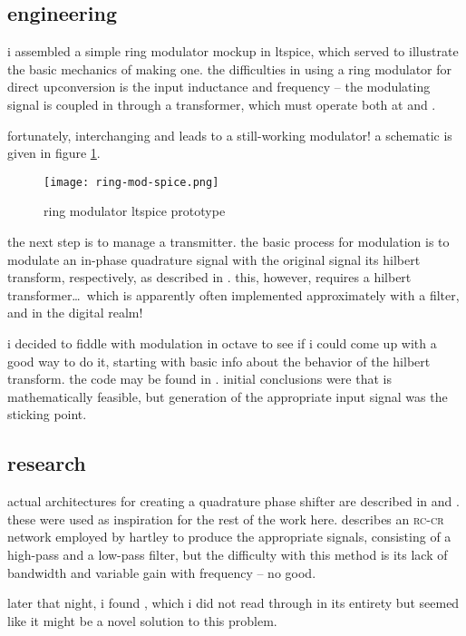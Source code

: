 \subsection*{engineering}
i assembled a simple ring modulator mockup in ltspice, which served to
illustrate the basic mechanics of making one. the difficulties in using a ring
modulator for direct upconversion is the input inductance and frequency -- the
modulating signal is coupled in through a transformer, which must operate both
at \rf and \ifreq.

fortunately, interchanging \rf and \ifreq leads to a still-working modulator! a
schematic is given in figure \ref{fig:ring-mod-spice}.

\begin{figure}[H]
	\centering
	\texttt{[image: ring-mod-spice.png]}
	\caption{ring modulator ltspice prototype}
	\label{fig:ring-mod-spice}
\end{figure}

the next step is to manage a \ssb transmitter. the basic process for \ssb
modulation is to modulate an in-phase \amp quadrature signal with the original
signal \amp its hilbert transform, respectively, as described in
\autocite{matlab-ssb}. this, however, requires a hilbert transformer\ldots\
which is apparently often implemented approximately with a filter, and in the
digital realm!

i decided to fiddle with \ssb modulation in octave to see if i could come up
with a good way to do it, starting with basic info about the behavior of the
hilbert transform. the code may be found in
. initial conclusions were that \ssb is
mathematically feasible, but generation of the appropriate input signal was the
sticking point.

\subsection*{research}

actual architectures for creating a quadrature phase shifter are described in
\autocite{wideband-shifter} and \autocite{audio-shifter}. these were used as
inspiration for the rest of the work here. \autocite{wideband-shifter}
describes an \textsc{rc-cr} network employed by hartley to produce the
appropriate signals, consisting of a high-pass and a low-pass filter, but the
difficulty with this method is its lack of bandwidth and variable gain with
frequency -- no good.

later that night, i found \autocite{shade-shifter}, which i did not read
through in its entirety but seemed like it might be a novel solution to this
problem.
